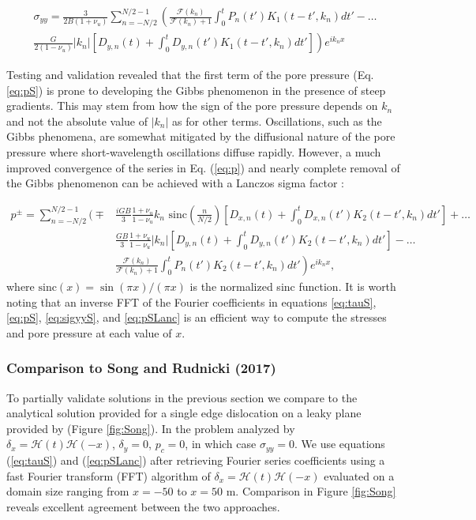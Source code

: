 \documentclass[draft]{agujournal2019}
\begin{document}
\begin{align}
\sigma_{yy} = \frac{3 }{2 B (1 + \nu_u)} \sum_{n = -N/2}^{N/2 - 1} \left( \frac{  \mathcal{F}(k_n) }{\mathcal{F}(k_n) + 1}  \int_0^t P_n(t') K_1(t-t',k_n) dt' \right. - \ldots \nonumber  \\
\left. \frac{G}{2(1-\nu_u)} |k_n| \left[D_{y,n}(t) + \int_0^t D_{y,n}(t') K_1 (t - t',k_n) dt'\right]  \right) e^{ik_n x}
\label{eq:sigyyS}
\end{align}
	
Testing and validation revealed that the first term of the pore pressure (Eq. \ref{eq:pS}) is prone to developing the Gibbs phenomenon in the presence of steep gradients. This may stem from  how the sign of the pore pressure depends on $k_n$ and not the absolute value of $|k_n|$ as for other terms. Oscillations, such as the Gibbs phenomena, are somewhat mitigated by the diffusional nature of the pore pressure where short-wavelength oscillations diffuse rapidly. However, a much improved convergence of the series in Eq. (\ref{eq:p}) and nearly complete removal of the Gibbs phenomenon can be achieved with a Lanczos sigma factor \cite{Duchon1979}:

\begin{align}
\label{eq:pSLanc}
p^\pm =   \sum_{n = -N/2}^{N/2 - 1}  \bigg( \mp & \frac{i G B }{3} \frac{1+\nu_u}{1-\nu_u} k_n \text{ sinc} \left( \frac{n}{N/2} \right)  \left[ D_{x,n}(t) + \int_0^t D_{x,n}(t') K_2 (t - t',k_n) dt' \right] + \ldots \nonumber \\ 
 & \frac{G B }{3} \frac{1+\nu_u}{1-\nu_u} |k_n| \left[ D_{y,n}(t) + \int_0^t D_{y,n}(t') K_2 (t - t',k_n) dt' \right] - \dots \nonumber  \\ 
& \left. \frac{  \mathcal{F}(k_n) }{\mathcal{F}(k_n) + 1} \int_0^t P_n(t') K_2 (t - t',k_n) dt'    \right) e^{ik_n x} ,
\end{align}	
where $\text{sinc}(x) = \sin{ (\pi x)}/(\pi x)$ is the normalized sinc function. It is worth noting that an inverse FFT of the Fourier coefficients in equations \ref{eq:tauS}, \ref{eq:pS}, \ref{eq:sigyyS}, and \ref{eq:pSLanc}  is an efficient way to compute the stresses and pore pressure at each value of $x$.

\subsubsection{Comparison to Song and Rudnicki (2017)}
To partially validate solutions in the previous section we compare to the analytical solution provided for a single edge dislocation on a leaky plane provided by  (Figure \ref{fig:Song}). In the problem analyzed by  $\delta_x = \mathcal{H}(t)\mathcal{H}(-x)$, $\delta_y = 0$, $p_c = 0$, in which case $\sigma_{yy} = 0$. We use equations (\ref{eq:tauS}) and (\ref{eq:pSLanc}) after retrieving Fourier series coefficients using a fast Fourier transform (FFT) algorithm of $\delta_x = \mathcal{H}(t)\mathcal{H}(-x)$ evaluated on a domain size ranging from $x = -50$ to $x = 50$ m. Comparison in Figure \ref{fig:Song} reveals excellent agreement between the two approaches.
\end{document}
